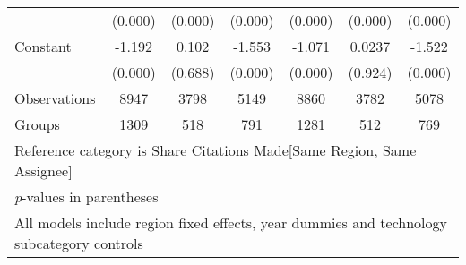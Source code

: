 \begin{sidewaystable}[htbp]
\begin{tabular}{l*{6}{c}}
                &  (0.000)&  (0.000)&  (0.000)&  (0.000)&  (0.000)&  (0.000)\\
Constant        &   -1.192&    0.102&   -1.553&   -1.071&   0.0237&   -1.522\\
                &  (0.000)&  (0.688)&  (0.000)&  (0.000)&  (0.924)&  (0.000)\\
\hline
Observations    &     8947&     3798&     5149&     8860&     3782&     5078\\
Groups          &     1309&      518&      791&     1281&      512&      769\\
\hline\hline
\multicolumn{7}{l}{\footnotesize Reference category is Share Citations Made[Same Region, Same Assignee]}\\
\multicolumn{7}{l}{\footnotesize \textit{p}-values in parentheses}\\
\multicolumn{7}{l}{\footnotesize All models include region fixed effects, year dummies and technology subcategory controls}\\
\end{tabular}
\end{sidewaystable}

